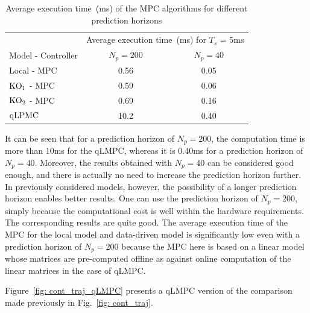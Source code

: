 \begin{table}[H]
    \centering
    \begin{tabular}{lcc}
         \toprule
                                  & \multicolumn{2}{c}{Average execution time~(ms) for $T_s$ = 5ms}\\
        \cmidrule{2-3}
         Model - Controller       & $N_p = 200$  & $N_p = 40$\\
         \midrule
         Local - MPC               & 0.56        & 0.05\\
         $\textup{KO}_1$ - MPC    & 0.59         & 0.06\\
         $\textup{KO}_2$ - MPC    & 0.69         & 0.16\\
         $\textup{qLPMC}$         & 10.2         & 0.40\\
         \bottomrule
    \end{tabular}
    \caption{Average execution time~(ms) of the MPC algorithms for different prediction horizons}
    \label{tab:Exec_predHor}
\end{table}
It can be seen that for a prediction horizon of $N_p = 200$, the computation time is more than 10ms for the qLMPC, whereas it is 0.40ms for a prediction horizon of $N_p = 40.$ Moreover, the results obtained with $N_p = 40$ can be considered good enough, and there is actually no need to increase the prediction horizon further. In previously considered models, however, the possibility of a longer prediction horizon enables better results. One can use the prediction horizon of $N_p = 200$, simply because the computational cost is well within the hardware requirements. The corresponding results are quite good. The average execution time of the MPC for the local model and data-driven model is significantly low even with a prediction horizon of $N_p = 200$ because the MPC here is based on a linear model whose matrices are pre-computed offline as against online computation of the linear matrices in the case of qLMPC. \par
Figure~\ref{fig: cont_traj_qLMPC} presents a qLMPC version of the comparison made previously in Fig.~\ref{fig: cont_traj}. 
% 
